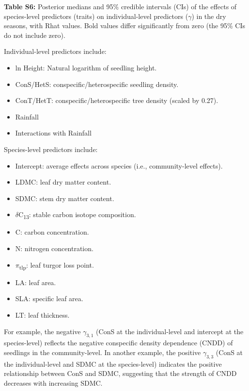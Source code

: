 \documentclass[
  12pt,
  letterpaper,
  DIV=11,
  numbers=noendperiod]{scrartcl}
\providecommand{\tightlist}{%
  \setlength{\itemsep}{0pt}\setlength{\parskip}{0pt}}\usepackage{longtable,booktabs,array}
\begin{document}
\newpage

\textbf{Table S6:} Posterior medians and 95\% credible intervals (CIs)
of the effects of species-level predictors (traits) on individual-level
predictors (\(\gamma\)) in the dry seasons, with Rhat values. Bold
values differ significantly from zero (the 95\% CIs do not include
zero).

Individual-level predictors include:

\begin{itemize}
\tightlist
\item
  ln Height: Natural logarithm of seedling height.
\item
  ConS/HetS: conspecific/heterospecific seedling density.
\item
  ConT/HetT: conspecific/heterospecific tree density (scaled by 0.27).
\item
  Rainfall
\item
  Interactions with Rainfall
\end{itemize}

Species-level predictors include:

\begin{itemize}
\tightlist
\item
  Intercept: average effects across species (i.e., community-level
  effects).
\item
  LDMC: leaf dry matter content.
\item
  SDMC: stem dry matter content.
\item
  \(\delta\)C\textsubscript{13}: stable carbon isotope composition.
\item
  C: carbon concentration.
\item
  N: nitrogen concentration.
\item
  \(\pi\)\textsubscript{tlp}: leaf turgor loss point.
\item
  LA: leaf area.
\item
  SLA: specific leaf area.
\item
  LT: leaf thickness.
\end{itemize}

For example, the negative \(\gamma_{3,1}\) (ConS at the individual-level
and intercept at the species-level) reflects the negative conspecific
density dependence (CNDD) of seedlings in the community-level. In
another example, the positive \(\gamma_{3,3}\) (ConS at the
individual-level and SDMC at the species-level) indicates the positive
relationship between ConS and SDMC, suggesting that the strength of CNDD
decreases with increasing SDMC.
\end{document}
